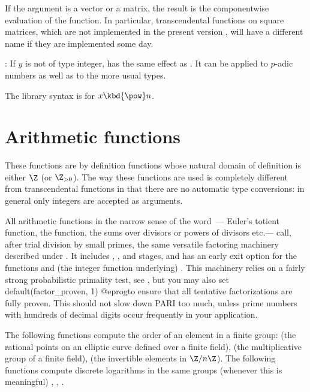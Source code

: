 \item If the argument is a vector or a matrix, the result is the
componentwise evaluation of the function. In particular, transcendental
functions on square matrices, which are not implemented in the present
version \vers, will have a different name if they are implemented some day.

\subseckbd{\pow}: If $y$ is not of type integer,  has the same
effect as . It can be applied to $p$-adic numbers as well
as to the more usual types.

The library syntax is 
for $x\hbox{\kbd{\pow}}n$.


\section{Arithmetic functions}\label{se:arithmetic}

These functions are by definition functions whose natural domain of
definition is either $\Z$ (or $\Z_{>0}$). The way these functions are used is
completely different from transcendental functions in that there are no
automatic type conversions: in general only integers are accepted as
arguments.

All arithmetic functions in the narrow sense of the word~--- Euler's
totient function, the  function,
the sums over divisors or powers of divisors etc.--- call, after trial
division by small primes, the same versatile factoring machinery described
under . It includes , ,
 and  stages, and has an early exit option for the
functions  and (the integer function underlying)
. This machinery relies on a fairly strong
probabilistic primality test, see , but you may also set
\bprog
  default(factor_proven, 1)
@eprog\noindent to ensure that all tentative factorizations are fully proven.
This should not slow down PARI too much, unless prime numbers with
hundreds of decimal digits occur frequently in your application.

\label{se:DLfun}

The following functions compute the order of an element in a finite group:
 (the rational points on an elliptic curve defined over a
finite field),  (the multiplicative group of a finite field),
 (the invertible elements in $\Z/n\Z$). The following functions
compute discrete logarithms in the same groups (whenever this is meaningful)
, , .

